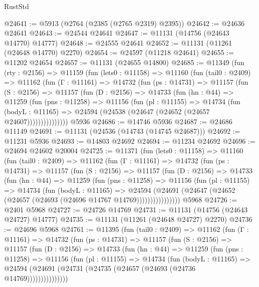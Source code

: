 \begin{lexlean}{RustStd}
\begin{coremodule}
@24641 := @5913 (@2764 (@2385 (@2765 @2319) @2395))
@24642 := @24636 @24641
@24643 := @24544 @24641
@24647 := @11131 (@14756 (@24643 @14770) @14777)
@24648 := @24555 @24641
@24652 := @11131 (@11261 (@24648 @14770) @2270)
@24654 := @24597 (@11218 @24641)
@24655 := @11202 @24654
@24657 := @11131 (@24655 @14800)
@24685 := @11349
    (fun (rty : @2156) =>
    @11159
      (fun (lets0 : @11158) =>
      @11160
        (fun (tail0 : @2409) =>
        @11162
          (fun (Γ : @11161) =>
          @14732
            (fun (ps : @14731) =>
            @11157
              (fun (S : @2156) =>
              @11157
                (fun (D : @2156) =>
                @14733
                  (fun (hn : @44) =>
                  @11259
                    (fun (pns : @11258) =>
                    @11156
                      (fun (pl : @11155) =>
                      @14734
                        (fun (bodyL : @11165) =>
                        @24594 (@24538 (@24647 (@24652 (@24657 @24607)))))))))))))))
    @5936
@24686 := @14746 @5936
@24687 := @24686 @11149
@24691 := @11131 (@24536 (@14743 (@14745 @24687)))
@24692 := @11231 @5936
@24693 := @14803 @24692
@24694 := @11234 @24692
@24696 := @24694 @24602 @20004
@24725 := @11371
    (fun (lets0 : @11158) =>
    @11160
      (fun (tail0 : @2409) =>
      @11162
        (fun (Γ : @11161) =>
        @14732
          (fun (ps : @14731) =>
          @11157
            (fun (S : @2156) =>
            @11157
              (fun (D : @2156) =>
              @14733
                (fun (hn : @44) =>
                @11259
                  (fun (pns : @11258) =>
                  @11156
                    (fun (pl : @11155) =>
                    @14734
                      (fun (bodyL : @11165) =>
                      @24594
                        (@24691
                          (@24647 (@24652 (@24657 (@24693 (@24696 @14767 @14769))))))))))))))))
    @5968
@24726 := @2401 @5968
@24727 := @24726 @14769
@24731 := @11131 (@14756 (@24643 @24727) @14777)
@24735 := @11131 (@11261 (@24648 @24727) @2270)
@24736 := @24696 @5968
@24761 := @11395
    (fun (tail0 : @2409) =>
    @11162
      (fun (Γ : @11161) =>
      @14732
        (fun (ps : @14731) =>
        @11157
          (fun (S : @2156) =>
          @11157
            (fun (D : @2156) =>
            @14733
              (fun (hn : @44) =>
              @11259
                (fun (pns : @11258) =>
                @11156
                  (fun (pl : @11155) =>
                  @14734
                    (fun (bodyL : @11165) =>
                    @24594 (@24691 (@24731 (@24735 (@24657 (@24693 (@24736 @14769)))))))))))))))

\end{coremodule}
\end{lexlean}
